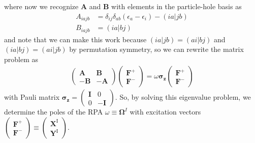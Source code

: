 where now we recognize $\mathbf{A}$ and $\mathbf{B}$ with elements in the particle-hole basis as
\begin{align}
    A_{i a j b} &= \delta_{i j} \delta_{a b} \left(\epsilon_{a} - \epsilon_{i}\right) - (i a | j b) \\
    B_{i a j b} &= (i a | b j)
\end{align}
and note that we can make this work because $(ia|jb)=(ai|bj)$ and $(ia|bj)=(ai|jb)$ by permutation symmetry, so we can rewrite the matrix problem as
\begin{align}
    \begin{pmatrix}
        \mathbf{A} & \mathbf{B} \\
        -\mathbf{B} & -\mathbf{A}
    \end{pmatrix}
\begin{pmatrix}
    \mathbf{F}^{+} \\
    \mathbf{F}^{-}
\end{pmatrix} = \omega \mathbf{\sigma_z}
\begin{pmatrix}
    \mathbf{F}^{+} \\
    \mathbf{F}^{-}
\end{pmatrix}
\end{align}
with Pauli matrix $\mathbf{\sigma_z}=\begin{pmatrix}
    \mathbf{I} & 0 \\
    0 & -\mathbf{I}
\end{pmatrix}$.
So, by solving this eigenvalue problem, we determine the poles of the RPA $\omega \equiv\mathbf{\Omega}^I$ with excitation vectors $\begin{pmatrix}
    \mathbf{F}^{+} \\
    \mathbf{F}^{-}
\end{pmatrix} \equiv \begin{pmatrix}
    \mathbf{X}^{\mathrm{I}} \\
    \mathbf{Y}^{\mathrm{I}}
\end{pmatrix}$. 


